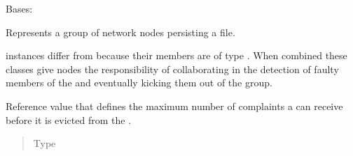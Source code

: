 \documentclass[letterpaper,10pt,english]{sphinxmanual}
\begin{document}
\begin{fulllineitems}
\label{\detokenize{app.domain:app.domain.cluster_groups.SGClusterExt}}
Bases: {\hyperref[\detokenize{app.domain:app.domain.cluster_groups.SGCluster}]{}}

Represents a group of network nodes persisting a file.

 instances differ from
{\hyperref[\detokenize{app.domain:app.domain.cluster_groups.SGCluster}]{}} because their members are
of type {\hyperref[\detokenize{app.domain:app.domain.network_nodes.SGNodeExt}]{}}. When combined
these classes give nodes the responsibility of collaborating in the
detection of faulty members of the  and eventually
kicking them out of the group.

\begin{fulllineitems}
\label{\detokenize{app.domain:app.domain.cluster_groups.SGClusterExt.complaint_threshold}}
Reference value that defines the maximum number of complaints a
{\hyperref[\detokenize{app.domain:app.domain.network_nodes.SGNodeExt}]{}}
can receive before it is evicted from the .
\begin{quote}\begin{description}
\item[{Type}] \leavevmode
{}

\end{description}\end{quote}

\end{fulllineitems}



\end{fulllineitems}
\end{document}
